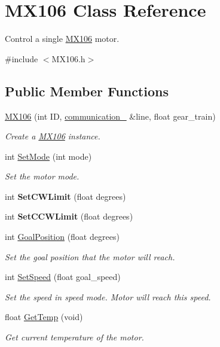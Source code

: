 \hypertarget{class_m_x106}{}\section{M\+X106 Class Reference}
\label{class_m_x106}


Control a single \hyperlink{class_m_x106}{M\+X106} motor.  




{\ttfamily \#include $<$M\+X106.\+h$>$}

\subsection*{Public Member Functions}
\begin{DoxyCompactItemize}
\item 
\hyperlink{class_m_x106_ac413364acbcb66c88315d418a5be7d8e}{M\+X106} (int ID, \hyperlink{classcommunication__1}{communication\+\_} \&line, float gear\+\_\+train)
\begin{DoxyCompactList}\small\item\em Create a \hyperlink{class_m_x106}{M\+X106} instance. \end{DoxyCompactList}\item 
int \hyperlink{class_m_x106_a7de70ad947eebbe398e4fcf18222a8de}{Set\+Mode} (int mode)
\begin{DoxyCompactList}\small\item\em Set the motor mode. \end{DoxyCompactList}\item 
int {\bfseries Set\+C\+W\+Limit} (float degrees)\hypertarget{class_m_x106_a1ac021a9b34ba0970529bee8ae4e168f}{}\label{class_m_x106_a1ac021a9b34ba0970529bee8ae4e168f}

\item 
int {\bfseries Set\+C\+C\+W\+Limit} (float degrees)\hypertarget{class_m_x106_a86db972dd474db642a008625bebef821}{}\label{class_m_x106_a86db972dd474db642a008625bebef821}

\item 
int \hyperlink{class_m_x106_afafe22d441e2073dea60acda999cc245}{Goal\+Position} (float degrees)
\begin{DoxyCompactList}\small\item\em Set the goal position that the motor will reach. \end{DoxyCompactList}\item 
int \hyperlink{class_m_x106_ab347df7137e25c8a31d7c6b0c412ed76}{Set\+Speed} (float goal\+\_\+speed)
\begin{DoxyCompactList}\small\item\em Set the speed in speed mode. Motor will reach this speed. \end{DoxyCompactList}\item 
float \hyperlink{class_m_x106_a550761cebd3a9571f0ad001baace5157}{Get\+Temp} (void)
\begin{DoxyCompactList}\small\item\em Get current temperature of the motor. \end{DoxyCompactList}\end{DoxyCompactItemize}


